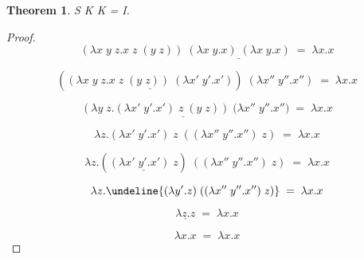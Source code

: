 \documentclass{article}
\newtheorem{theorem}{Theorem}
\begin{document}
\begin{theorem}
S K K = I.
\end{theorem}


\begin{proof}
$$(\lambda x\;y\;z.x\;z\;(y\;z))\;\underline{(\lambda x\;y.x)\;(\lambda x\;y.x)}\;=\;\lambda x.x$$
{\centering
    \par
}

$$(\underline{(\lambda x\;y\;z.x\;z\;(y\;z))\;(\lambda x'\;y'.x')})\;(\lambda x''\;y''.x'')\;=\;\lambda x.x$$
{\centering
    \downarrow{\beta}\par
}

$$\underline{(\lambda y\;z.(\lambda x'\;y'.x')\;z\;(y\;z))\;(\lambda x''\;y''.x''})\;=\;\lambda x.x$$
{\centering
    \downarrow{\beta}\par
}

$$\lambda z.(\lambda x'\;y'.x')\;z\;((\lambda x''\;y''.x'')\;z)\;=\;\lambda x.x$$
{\centering
    \par
}

$$\lambda z.(\underline{(\lambda x'\;y'.x')\;z})\;((\lambda x''\;y''.x'')\;z)\;=\;\lambda x.x$$
{\centering
    \downarrow{\beta}\par
}

$$\lambda z.\undeline{(\lambda y'.z)\;((\lambda x''\;y''.x'')\;z)}\;=\;\lambda x.x$$
{\centering
    \downarrow{\beta}\par
}

$$\underline{\lambda z.z}\;=\;\lambda x.x$$
{\centering
    \downarrow{\alpha}\par
}

$$\lambda x.x\;=\;\lambda x.x$$
\end{proof}
\end{document}
